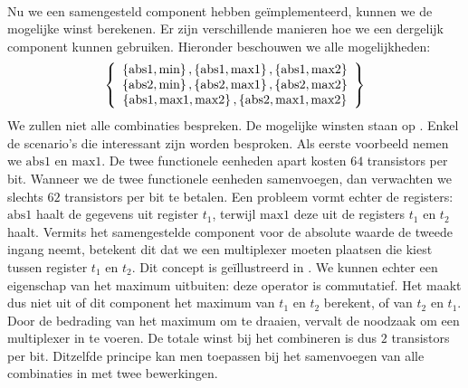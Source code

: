 \paragraph{}
Nu we een samengesteld component hebben ge\"implementeerd, kunnen we de mogelijke winst berekenen. Er zijn verschillende manieren hoe we een dergelijk component kunnen gebruiken. Hieronder beschouwen we alle mogelijkheden:
\begin{equation}
\acclarray{
\accl{\mbox{abs1},\mbox{min}},\accl{\mbox{abs1},\mbox{max1}},\accl{\mbox{abs1},\mbox{max2}}\\
\accl{\mbox{abs2},\mbox{min}},\accl{\mbox{abs2},\mbox{max1}},\accl{\mbox{abs2},\mbox{max2}}\\
\accl{\mbox{abs1},\mbox{max1},\mbox{max2}},\accl{\mbox{abs2},\mbox{max1},\mbox{max2}}}
\eqnlab{minimal-functionals-combinations}
\end{equation}
We zullen niet alle combinaties bespreken. De mogelijke winsten staan op . Enkel de scenario's die interessant zijn worden besproken. Als eerste voorbeeld nemen we $\mbox{abs1}$ en $\mbox{max1}$. De twee functionele eenheden apart kosten $64$ transistors per bit. Wanneer we de twee functionele eenheden samenvoegen, dan verwachten we slechts $62$ transistors per bit te betalen. Een probleem vormt echter de registers: $\mbox{abs1}$ haalt de gegevens uit register $t_1$, terwijl $\mbox{max1}$ deze uit de registers $t_1$ en $t_2$ haalt. Vermits het samengestelde component voor de absolute waarde de tweede ingang neemt, betekent dit dat we een multiplexer moeten plaatsen die kiest tussen register $t_1$ en $t_2$. Dit concept is ge\"illustreerd in .
We kunnen echter een eigenschap van het maximum uitbuiten: deze operator is commutatief. Het maakt dus niet uit of dit component het maximum van $t_1$ en $t_2$ berekent, of van $t_2$ en $t_1$. Door de bedrading van het maximum om te draaien, vervalt de noodzaak om een multiplexer in te voeren. De totale winst bij het combineren is dus $2$ transistors per bit. Ditzelfde principe kan men toepassen bij het samenvoegen van alle combinaties in  met twee bewerkingen.
